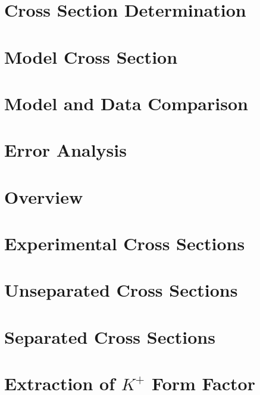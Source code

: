 \documentclass[
]{report}
\begin{document}
\hypertarget{Section-8.2}{%
\section{Cross Section Determination}\label{Section-8.2}}

\hypertarget{Section-8.3}{%
\section{Model Cross Section}\label{Section-8.3}}

\hypertarget{Section-8.4}{%
\section{Model and Data Comparison}\label{Section-8.4}}

\hypertarget{Section-8.5}{%
\section{Error Analysis}\label{Section-8.5}}

\label{Chapter-9}

\hypertarget{Section-9.1}{%
\section{Overview}\label{Section-9.1}}

\hypertarget{Section-9.2}{%
\section{Experimental Cross Sections}\label{Section-9.2}}

\hypertarget{Section-9.3}{%
\section{Unseparated Cross Sections}\label{Section-9.3}}

\hypertarget{Section-9.4}{%
\section{Separated Cross Sections}\label{Section-9.4}}

\hypertarget{Section-9.5}{%
\section{\texorpdfstring{Extraction of \(K^{+}\) Form
Factor}{Extraction of K\^{}\{+\} Form Factor}}\label{Section-9.5}}
\end{document}
